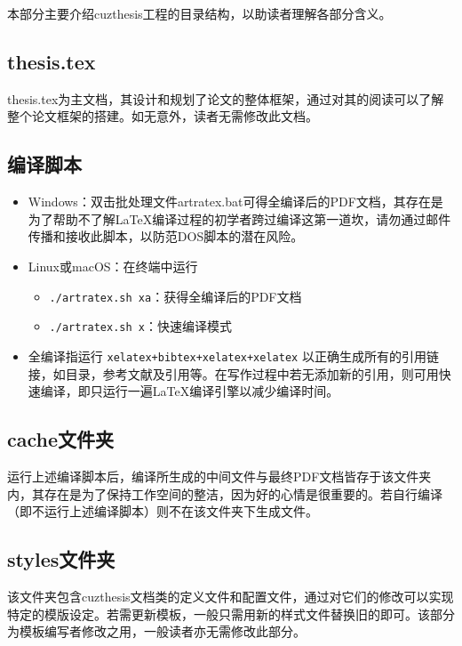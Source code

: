 本部分主要介绍cuzthesis工程的目录结构，以助读者理解各部分含义。

\subsection{thesis.tex}

thesis.tex为主文档，其设计和规划了论文的整体框架，通过对其的阅读可以了解整个论文框架的搭建。如无意外，读者无需修改此文档。

\subsection{编译脚本}

\begin{itemize}
    \item Windows：双击批处理文件artratex.bat可得全编译后的PDF文档，其存在是为了帮助不了解\LaTeX{}编译过程的初学者跨过编译这第一道坎，请勿通过邮件传播和接收此脚本，以防范DOS脚本的潜在风险。
    \item Linux或macOS：在终端中运行
        \begin{itemize}
            \item \verb|./artratex.sh xa|：获得全编译后的PDF文档
            \item \verb|./artratex.sh x|：快速编译模式
        \end{itemize}
    \item 全编译指运行 \verb|xelatex+bibtex+xelatex+xelatex| 以正确生成所有的引用链接，如目录，参考文献及引用等。在写作过程中若无添加新的引用，则可用快速编译，即只运行一遍\LaTeX{}编译引擎以减少编译时间。
\end{itemize}

\subsection{cache文件夹}

运行上述编译脚本后，编译所生成的中间文件与最终PDF文档皆存于该文件夹内，其存在是为了保持工作空间的整洁，因为好的心情是很重要的。若自行编译（即不运行上述编译脚本）则不在该文件夹下生成文件。

\subsection{styles文件夹}

该文件夹包含cuzthesis文档类的定义文件和配置文件，通过对它们的修改可以实现特定的模版设定。若需更新模板，一般只需用新的样式文件替换旧的即可。该部分为模板编写者修改之用，一般读者亦无需修改此部分。

